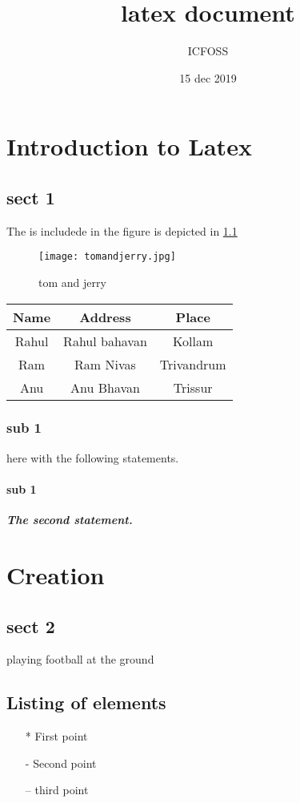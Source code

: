 \documentclass[12pt]{report}
\begin{document}
	
	\title{\textbf{latex document}}
	\author{ICFOSS}
	\date{15 dec 2019 }
	\maketitle
	
	\chapter{Introduction to Latex}
	\section*{sect 1}
	The\textit{} is includede in
		the figure is depicted in \ref{f:smile} 
		
	\begin{figure}[H]
	\centering
	\texttt{[image: tomandjerry.jpg]}
	\caption{tom and jerry}	
	\label{f:smile}
		\end{figure}
	\begin{center}
	\begin{tabular}{|c|c|c|}
		\hline
		Name & Address & Place\\
		\hline
		Rahul & Rahul bahavan & Kollam\\
		\hline
		Ram & Ram Nivas & Trivandrum\\
		\hline
		Anu & Anu Bhavan & Trissur\\
		\hline
	\end{tabular}
   \end{center}


	\subsection{sub 1}
	here with the following statements.
\subsubsection{sub 1}
	\textit{\textbf{The second statement.}}
	
	\chapter{Creation}
	\section*{sect 2}
	playing football at the ground
	\section{Listing of elements}
	\begin{itemize}
		\item[*] First point
		\item[-] Second point
		\item[--]third point
	\end{itemize}
\end{document}
